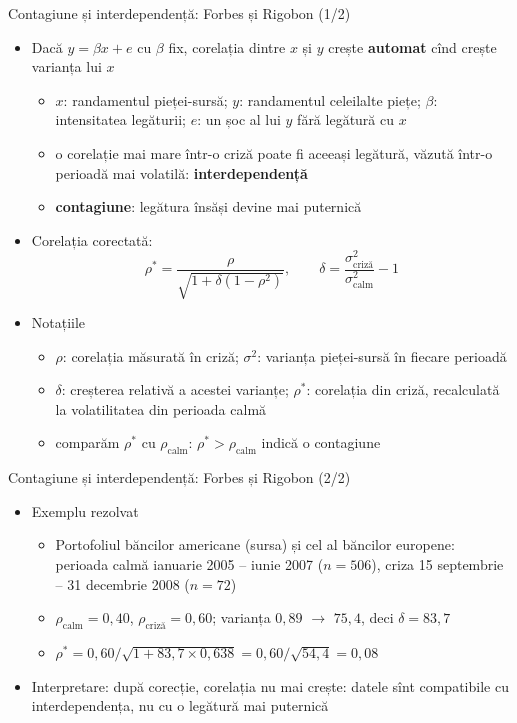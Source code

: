 \begin{frame}{Contagiune și interdependență: Forbes și Rigobon (1/2)}
\itemsize{\small}
\begin{itemize}
    \item Dacă $y = \beta x + e$ cu $\beta$ fix, corelația dintre $x$ și $y$ crește \textbf{automat} cînd crește varianța lui $x$ 
    \begin{itemize}
        \item $x$: randamentul pieței-sursă; $y$: randamentul celeilalte piețe; $\beta$: intensitatea legăturii; $e$: un șoc al lui $y$ fără legătură cu $x$
        \item o corelație mai mare într-o criză poate fi aceeași legătură, văzută într-o perioadă mai volatilă: \textbf{interdependență}
        \item \textbf{contagiune}: legătura însăși devine mai puternică
    \end{itemize}
    \item Corelația corectată: \[ \rho^* = \frac{\rho}{\sqrt{1 + \delta(1 - \rho^2)}}, \qquad \delta = \frac{\sigma^2_{\text{criză}}}{\sigma^2_{\text{calm}}} - 1 \]
    \item Notațiile
    \begin{itemize}
        \item $\rho$: corelația măsurată în criză; $\sigma^2$: varianța pieței-sursă în fiecare perioadă
        \item $\delta$: creșterea relativă a acestei varianțe; $\rho^*$: corelația din criză, recalculată la volatilitatea din perioada calmă
        \item comparăm $\rho^*$ cu $\rho_{\text{calm}}$: $\rho^* > \rho_{\text{calm}}$ indică o contagiune
    \end{itemize}
\end{itemize}
\end{frame}

\begin{frame}{Contagiune și interdependență: Forbes și Rigobon (2/2)}
\itemsize{\small}
\begin{itemize}
    \item Exemplu rezolvat
    \begin{itemize}
        \item Portofoliul băncilor americane (sursa) și cel al băncilor europene: perioada calmă ianuarie 2005 -- iunie 2007 ($n = 506$), criza 15 septembrie -- 31 decembrie 2008 ($n = 72$)
        \item $\rho_{\text{calm}} = 0{,}40$, $\rho_{\text{criză}} = 0{,}60$; varianța $0{,}89$ $\to$ $75{,}4$, deci $\delta = 83{,}7$
        \item $\rho^* = 0{,}60/\sqrt{1 + 83{,}7 \times 0{,}638} = 0{,}60/\sqrt{54{,}4} = 0{,}08$
    \end{itemize}
    \item Interpretare: după corecție, corelația nu mai crește: datele sînt compatibile cu interdependența, nu cu o legătură mai puternică
\end{itemize}
\end{frame}

